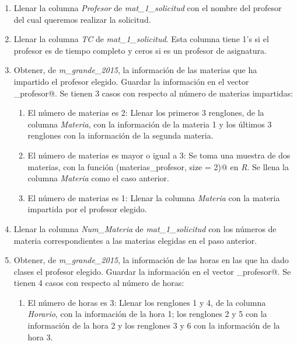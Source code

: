 \begin{enumerate}

\item Llenar la columna \textit{Profesor} de \textit{mat\_1\_solicitud} con el nombre del profesor del cual queremos realizar la solicitud.

\item Llenar la columna \textit{TC} de \textit{mat\_1\_solicitud}. Esta columna tiene 1's si el profesor es de tiempo completo y ceros si es un profesor de asignatura.

\item Obtener, de \textit{m\_grande\_2015}, la información de las materias que ha impartido el profesor elegido. Guardar la información en el vector \verb@materias_profesor@. Se tienen 3 casos con respecto al número de materias impartidas:

\begin{enumerate}
\item El número de materias es 2: Llenar los primeros 3 renglones, de la columna \textit{Materia}, con la información de la materia 1 y los últimos 3 renglones con la información de la segunda materia.

\item El número de materias es mayor o igual a 3: Se toma una muestra de dos materias, con la función \verb@sample(materias_profesor, size = 2)@ en \textit{R}. Se llena la columna \textit{Materia} como el caso anterior.

\item El número de materias es 1: Llenar la columna \textit{Materia} con la materia impartida por el profesor elegido.
\end{enumerate}

\item Llenar la columna \textit{Num\_Materia} de \textit{mat\_1\_solicitud} con los números de materia correspondientes a las materias elegidas en el paso anterior.

\item Obtener, de \textit{m\_grande\_2015}, la información de las horas en las que ha dado clases el profesor elegido. Guardar la información en el vector \verb@horas_profesor@. Se tienen 4 casos con respecto al número de horas:

\begin{enumerate}
\item El número de horas es 3: Llenar los renglones 1 y 4, de la columna \textit{Horario}, con la información de la hora 1; los renglones 2 y 5 con la información de la hora 2 y los renglones 3 y 6 con la información de la hora 3.


\end{enumerate}
\end{enumerate}
